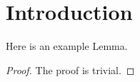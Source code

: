\section{Introduction}


\begin{lemma}
Here is an example Lemma.
\end{lemma}
\begin{proof}
The proof is trivial.
\end{proof}
\cite{test}